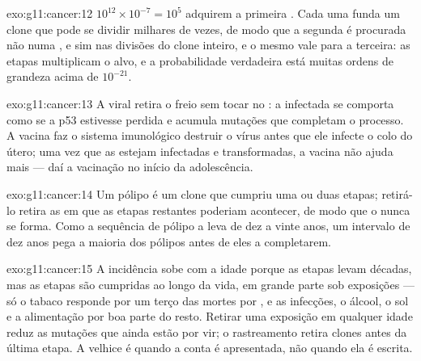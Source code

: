 \begin{solution}{exo:g11:cancer:12}
$10^{12} \times 10^{-7} = 10^5$  adquirem a primeira .
Cada uma funda um clone que pode se dividir milhares de vezes, de modo
que a segunda  é procurada não numa , e sim nas divisões
do clone inteiro, e o mesmo vale para a terceira: as etapas multiplicam
o alvo, e a probabilidade verdadeira está muitas ordens de grandeza
acima de $10^{-21}$.
\end{solution}

\begin{solution}{exo:g11:cancer:13}
A  viral retira o freio sem tocar no : a  infectada
se comporta como se a p53 estivesse perdida e acumula mutações que
completam o processo. A vacina faz o sistema imunológico destruir o
vírus antes que ele infecte o colo do útero; uma vez que as 
estejam infectadas e transformadas, a vacina não ajuda mais --- daí a
vacinação no início da adolescência.
\end{solution}

\begin{solution}{exo:g11:cancer:14}
Um pólipo é um clone que cumpriu uma ou duas etapas; retirá-lo retira
as  em que as etapas restantes poderiam acontecer, de modo que o
 nunca se forma. Como a sequência de pólipo a  leva de dez
a vinte anos, um intervalo de dez anos pega a maioria dos pólipos antes
de eles a completarem.
\end{solution}

\begin{solution}{exo:g11:cancer:15}
A incidência sobe com a idade porque as etapas levam décadas, mas as
etapas são cumpridas ao longo da vida, em grande parte sob exposições
--- só o tabaco responde por um terço das mortes por , e as
infecções, o álcool, o sol e a alimentação por boa parte do resto.
Retirar uma exposição em qualquer idade reduz as mutações que ainda
estão por vir; o rastreamento retira clones antes da última etapa. A
velhice é quando a conta é apresentada, não quando ela é escrita.
\end{solution}

